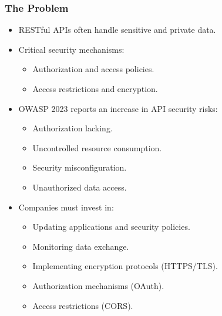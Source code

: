 \documentclass[10pt]{beamer}
\theoremstyle{remark}
\theoremstyle{definition}
\begin{document}
\begin{frame}
    \frametitle{The Problem}
    \begin{itemize}
        \item RESTful APIs often handle sensitive and private data.
        \item Critical security mechanisms:
        \begin{itemize}
            \item Authorization and access policies.
            \item Access restrictions and encryption.
        \end{itemize}
        \item OWASP 2023 reports an increase in API security risks:
        \begin{itemize}
            \item Authorization lacking.
            \item Uncontrolled resource consumption.
            \item Security misconfiguration.
            \item Unauthorized data access.
        \end{itemize}
        \item Companies must invest in:
        \begin{itemize}
            \item Updating applications and security policies.
            \item Monitoring data exchange.
            \item Implementing encryption protocols (HTTPS/TLS).
            \item Authorization mechanisms (OAuth).
            \item Access restrictions (CORS).
        \end{itemize}
    \end{itemize}
\end{frame}
\end{document}
